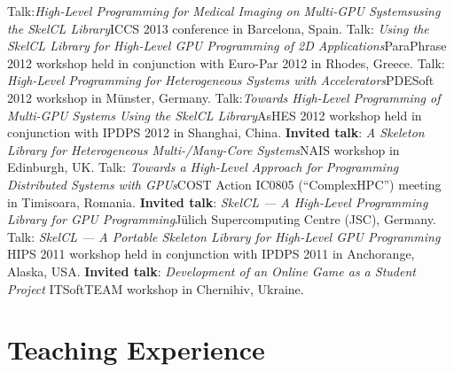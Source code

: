 \documentclass[11pt,a4paper]{moderncv}
\newcommand{\strong}[1]{\textcolor{color1}{\textbf{#1}}}
\begin{document}
         {Talk:\emph{High-Level Programming for Medical Imaging on Multi-GPU
          Systems\newline using the SkelCL Library}\newline \small ICCS 2013 conference in
          Barcelona, Spain.}
       {Talk: \emph{Using the SkelCL Library for High-Level GPU Programming of
        2D Applications}\newline \small ParaPhrase 2012 workshop held in
        conjunction with Euro-Par 2012 in Rhodes, Greece.}
       {Talk: \emph{High-Level Programming for Heterogeneous Systems with
        Accelerators}\newline \small PDESoft 2012 workshop in Münster, Germany.}
       {Talk:\emph{Towards High-Level Programming of Multi-GPU Systems Using
        the SkelCL Library}\newline \small AsHES 2012 workshop held in
        conjunction with IPDPS 2012 in Shanghai, China.}
       {\strong{Invited talk}: \emph{A Skeleton Library for Heterogeneous
        Multi-/Many-Core Systems}\newline \small NAIS workshop in Edinburgh, UK.}
       {Talk: \emph{Towards a High-Level Approach for Programming Distributed
        Systems with GPUs}\newline \small COST Action IC0805 (``ComplexHPC'')
        meeting in Timisoara, Romania.}
       {\strong{Invited talk}: \emph{SkelCL --- A High-Level Programming Library for GPU
        Programming}\newline \small Jülich Supercomputing Centre (JSC), Germany.}
       {Talk: \emph{SkelCL --- A Portable Skeleton Library for High-Level
        GPU Programming}\newline
        \small HIPS 2011 workshop held in conjunction with IPDPS 2011 in
        Anchorange, Alaska, USA.}
       {\strong{Invited talk}: \emph{Development of an Online Game as a Student Project}\newline
        \small ITSoftTEAM workshop in Chernihiv, Ukraine.}



\section{Teaching Experience}

\end{document}
